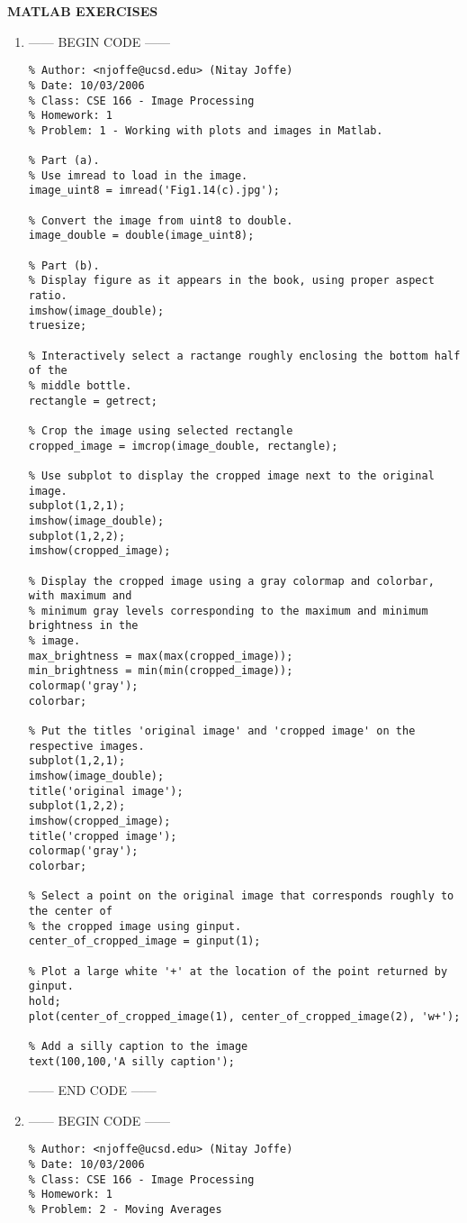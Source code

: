 \documentclass[9pt]{article}
\begin{document}
  \newpage
  \textbf{MATLAB EXERCISES}
  \begin{enumerate}
    \item
      ------ BEGIN CODE ------
      \begin{verbatim}
% Author: <njoffe@ucsd.edu> (Nitay Joffe)
% Date: 10/03/2006
% Class: CSE 166 - Image Processing
% Homework: 1
% Problem: 1 - Working with plots and images in Matlab.

% Part (a).
% Use imread to load in the image.
image_uint8 = imread('Fig1.14(c).jpg');

% Convert the image from uint8 to double.
image_double = double(image_uint8);

% Part (b).
% Display figure as it appears in the book, using proper aspect ratio.
imshow(image_double);
truesize;

% Interactively select a ractange roughly enclosing the bottom half of the
% middle bottle.
rectangle = getrect;

% Crop the image using selected rectangle
cropped_image = imcrop(image_double, rectangle);

% Use subplot to display the cropped image next to the original image.
subplot(1,2,1);
imshow(image_double);
subplot(1,2,2);
imshow(cropped_image);

% Display the cropped image using a gray colormap and colorbar, with maximum and
% minimum gray levels corresponding to the maximum and minimum brightness in the
% image.
max_brightness = max(max(cropped_image));
min_brightness = min(min(cropped_image));
colormap('gray');
colorbar;

% Put the titles 'original image' and 'cropped image' on the respective images.
subplot(1,2,1);
imshow(image_double);
title('original image');
subplot(1,2,2);
imshow(cropped_image);
title('cropped image');
colormap('gray');
colorbar;

% Select a point on the original image that corresponds roughly to the center of
% the cropped image using ginput.
center_of_cropped_image = ginput(1);

% Plot a large white '+' at the location of the point returned by ginput.
hold;
plot(center_of_cropped_image(1), center_of_cropped_image(2), 'w+');

% Add a silly caption to the image
text(100,100,'A silly caption'); \end{verbatim}
      ------ END CODE ------ \\
    \item
      ------ BEGIN CODE ------
      \begin{verbatim}
% Author: <njoffe@ucsd.edu> (Nitay Joffe)
% Date: 10/03/2006
% Class: CSE 166 - Image Processing
% Homework: 1
% Problem: 2 - Moving Averages


\end{verbatim}
\end{enumerate}
\end{document}
